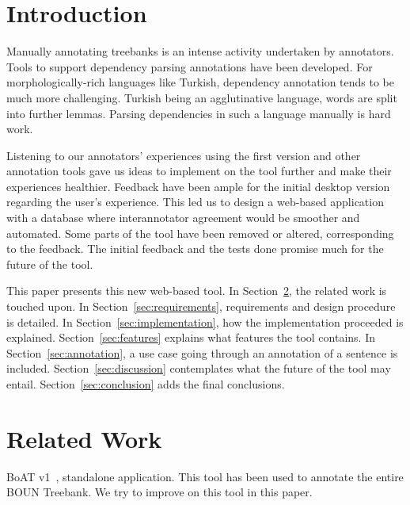 \documentclass[
]{ceurart}
\begin{document}
\maketitle

\section{Introduction}
\label{sec:introduction}

Manually annotating treebanks is an intense activity undertaken by annotators.
Tools to support dependency parsing annotations have been developed. %
For morphologically-rich languages like Turkish, dependency annotation tends to be much more challenging.
Turkish being an agglutinative language, words are split into further lemmas.
Parsing dependencies in such a language manually is hard work.

Listening to our annotators' experiences using the first version and other annotation tools gave us ideas to implement on the tool further and make their experiences healthier.
Feedback have been ample for the initial desktop version regarding the user's experience.
This led us to design a web-based application with a database where interannotator agreement would be smoother and automated.
Some parts of the tool have been removed or altered, corresponding to the feedback.
The initial feedback and the tests done promise much for the future of the tool.

This paper presents this new web-based tool.
In Section~\ref{sec:related}, the related work is touched upon.
In Section~\ref{sec:requirements}, requirements and design procedure is detailed.
In Section~\ref{sec:implementation}, how the implementation proceeded is explained.
Section~\ref{sec:features} explains what features the tool contains.
In Section~\ref{sec:annotation}, a use case going through an annotation of a sentence is included.
Section~\ref{sec:discussion} contemplates what the future of the tool may entail.
Section~\ref{sec:conclusion} adds the final conclusions.

\section{Related Work}
\label{sec:related}

BoAT v1~\cite{turk-etal-2019-turkish}, standalone application.
This tool has been used to annotate the entire BOUN Treebank.
We try to improve on this tool in this paper.
\end{document}
